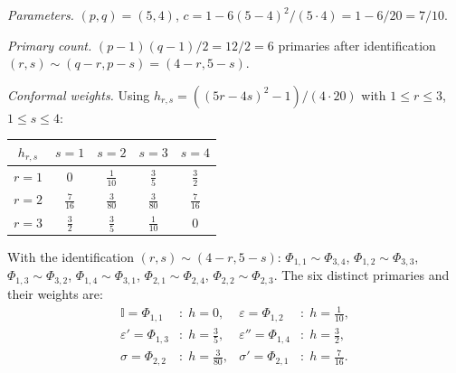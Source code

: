 \begin{computation}
\label{comp:tricritical-ising}

\emph{Parameters.}
$(p,q) = (5,4)$, $c = 1 - 6(5-4)^2/(5 \cdot 4) = 1 - 6/20 = 7/10$.

\emph{Primary count.}
$(p-1)(q-1)/2 = 12/2 = 6$ primaries after identification
$(r,s) \sim (q-r, p-s) = (4-r, 5-s)$.

\emph{Conformal weights.}
Using $h_{r,s} = ((5r - 4s)^2 - 1)/(4 \cdot 20)$
with $1 \leq r \leq 3$, $1 \leq s \leq 4$:
\begin{center}
\renewcommand{\arraystretch}{1.3}
\begin{tabular}{c|cccc}
$h_{r,s}$ & $s=1$ & $s=2$ & $s=3$ & $s=4$ \\
\hline
$r=1$ & $0$ & $\frac{1}{10}$ & $\frac{3}{5}$ & $\frac{3}{2}$ \\[3pt]
$r=2$ & $\frac{7}{16}$ & $\frac{3}{80}$ & $\frac{3}{80}$ & $\frac{7}{16}$ \\[3pt]
$r=3$ & $\frac{3}{2}$ & $\frac{3}{5}$ & $\frac{1}{10}$ & $0$
\end{tabular}
\end{center}
With the identification $(r,s) \sim (4-r,5-s)$:
$\Phi_{1,1} \sim \Phi_{3,4}$, $\Phi_{1,2} \sim \Phi_{3,3}$,
$\Phi_{1,3} \sim \Phi_{3,2}$, $\Phi_{1,4} \sim \Phi_{3,1}$,
$\Phi_{2,1} \sim \Phi_{2,4}$, $\Phi_{2,2} \sim \Phi_{2,3}$.
The six distinct primaries and their weights are:
\begin{align*}
\mathbb{I} = \Phi_{1,1}&: \; h = 0, &
\varepsilon = \Phi_{1,2}&: \; h = \tfrac{1}{10}, \\
\varepsilon' = \Phi_{1,3}&: \; h = \tfrac{3}{5}, &
\varepsilon'' = \Phi_{1,4}&: \; h = \tfrac{3}{2}, \\
\sigma = \Phi_{2,2}&: \; h = \tfrac{3}{80}, &
\sigma' = \Phi_{2,1}&: \; h = \tfrac{7}{16}.
\end{align*}
\end{computation}

